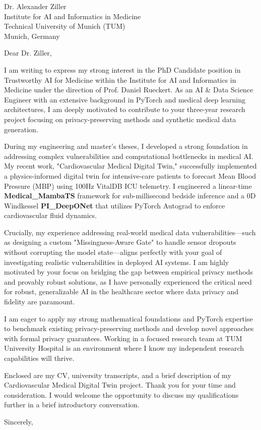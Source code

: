 \documentclass[11pt,a4paper]{letter}
\begin{document}
\begin{letter}{
    Dr. Alexander Ziller \\
    Institute for AI and Informatics in Medicine \\
    Technical University of Munich (TUM) \\
    Munich, Germany
}

\opening{Dear Dr. Ziller,}

I am writing to express my strong interest in the PhD Candidate position in Trustworthy AI for Medicine within the Institute for AI and Informatics in Medicine under the direction of Prof. Daniel Rueckert. As an AI \& Data Science Engineer with an extensive background in PyTorch and medical deep learning architectures, I am deeply motivated to contribute to your three-year research project focusing on privacy-preserving methods and synthetic medical data generation.

During my engineering and master's theses, I developed a strong foundation in addressing complex vulnerabilities and computational bottlenecks in medical AI. My recent work, "Cardiovascular Medical Digital Twin," successfully implemented a physics-informed digital twin for intensive-care patients to forecast Mean Blood Pressure (MBP) using 100Hz VitalDB ICU telemetry. I engineered a linear-time \textbf{Medical\_MambaTS} framework for sub-millisecond bedside inference and a 0D Windkessel \textbf{PI\_DeepONet} that utilizes PyTorch Autograd to enforce cardiovascular fluid dynamics. 

Crucially, my experience addressing real-world medical data vulnerabilities—such as designing a custom "Missingness-Aware Gate" to handle sensor dropouts without corrupting the model state—aligns perfectly with your goal of investigating realistic vulnerabilities in deployed AI systems. I am highly motivated by your focus on bridging the gap between empirical privacy methods and provably robust solutions, as I have personally experienced the critical need for robust, generalizable AI in the healthcare sector where data privacy and fidelity are paramount.

I am eager to apply my strong mathematical foundations and PyTorch expertise to benchmark existing privacy-preserving methods and develop novel approaches with formal privacy guarantees. Working in a focused research team at TUM University Hospital is an environment where I know my independent research capabilities will thrive.

Enclosed are my CV, university transcripts, and a brief description of my Cardiovascular Medical Digital Twin project. Thank you for your time and consideration. I would welcome the opportunity to discuss my qualifications further in a brief introductory conversation.

\closing{Sincerely,}

\end{letter}
\end{document}
